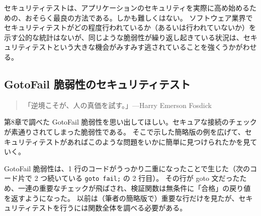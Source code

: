 \documentclass[uplatex]{jsarticle}
\def\label#1{}%
\begin{document}
セキュリティテストは、アプリケーションのセキュリティを実際に高め始めるための、おそらく最良の方法である。しかも難しくはない。
ソフトウェア業界でセキュリティテストがどの程度行われているか（あるいは行われていないか）を示す公的な統計はないが、同じような脆弱性が繰り返し起きている状況は、セキュリティテストという大きな機会がみすみす逃されていることを強くうかがわせる。

\subsection{GotoFail 脆弱性のセキュリティテスト}\label{subsec:ch12-gotofail}

\begin{quote}
「逆境こそが、人の真価を試す。」\hfill ---Harry Emerson Fosdick
\end{quote}

第8章で調べた GotoFail 脆弱性を思い出してほしい。セキュアな接続のチェックが素通りされてしまった脆弱性である。
そこで示した簡略版の例を広げて、セキュリティテストがあればこのような問題をいかに簡単に見つけられたかを見ていく。

GotoFail 脆弱性は、1 行のコードがうっかり二重になったことで生じた（次のコード片で 2 つ続いている \texttt{goto fail;} の 2 行目）。
その行が goto 文だったため、一連の重要なチェックが飛ばされ、検証関数は無条件に「合格」の戻り値を返すようになった。
以前は（筆者の簡略版で）重要な行だけを見たが、セキュリティテストを行うには関数全体を調べる必要がある。
\end{document}
